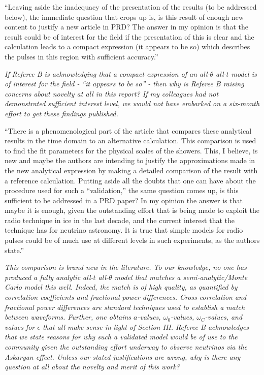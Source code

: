 \documentclass[12pt]{article}
\begin{document}
``Leaving aside the inadequacy of the presentation of the results (to be addressed below), the immediate question that crops up is, is this result of enough new content to justify a new article in PRD? The answer in my opinion is that the result could be of interest for the field if the presentation of this is clear and the calculation leads to a compact expression (it appears to be so) which describes the pulses in this region with sufficient accuracy.''

\textit{If Referee B is acknowledging that a compact expression of an all-$\theta$ all-$t$ model is of interest for the field - ``it appears to be so'' - then why is Referee B raising concerns about novelty at all in this report?  If my colleagues had not demonstrated sufficient interest level, we would not have embarked on a six-month effort to get these findings published.}

``There is a phenomenological part of the article that compares these analytical results in the time domain to an alternative calculation. This comparison is used to find the fit parameters for the physical scales of the showers. This, I believe, is new and maybe the authors are intending to justify the approximations made in the new analytical expression by making a detailed comparison of the result with a reference calculation. Putting aside all the doubts that one can have about the procedure used for such a ``validation,'' the same question comes up, is this sufficient to be addressed in a PRD paper? In my opinion the answer is that maybe it is enough, given the outstanding effort that is being made to exploit the radio technique in ice in the last decade, and the current interest that the technique has for neutrino astronomy. It is true that simple models for radio pulses could be of much use at different levels in such experiments, as the authors state.''

\textit{This comparison is brand new in the literature.  To our knowledge, no one has produced a fully analytic all-$t$ all-$\theta$ model that matches a semi-analytic/Monte Carlo model this well.  Indeed, the match is of high quality, as quantified by correlation coefficients and fractional power differences.  Cross-correlation and fractional power differences are standard techniques used to establish a match between waveforms.  Further, one obtains $a$-values, $\omega_0$-values, $\omega_C$-values, and values for $\epsilon$ that all make sense in light of Section III.  Referee B acknowledges that we state reasons for why such a validated model would be of use to the community given the outstanding effort underway to observe neutrinos via the Askaryan effect.  Unless our stated justifications are wrong, why is there any question at all about the novelty and merit of this work?}
\end{document}
